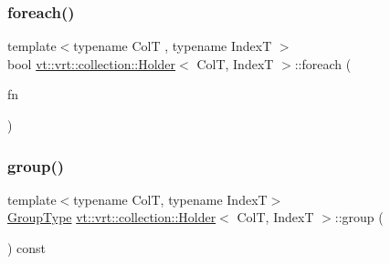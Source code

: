 \mbox{\label{structvt_1_1vrt_1_1collection_1_1_holder_a9cd9b190a9e1cf6726c520623a2ff4d2}} 
\subsubsection{\texorpdfstring{foreach()}{foreach()}}
{\footnotesize\ttfamily template$<$typename ColT , typename IndexT $>$ \\
bool \hyperlink{structvt_1_1vrt_1_1collection_1_1_holder}{vt\+::vrt\+::collection\+::\+Holder}$<$ ColT, IndexT $>$\+::foreach (\begin{DoxyParamCaption}\item[{\hyperlink{structvt_1_1vrt_1_1collection_1_1_holder_a26e20d23447e935e218a07ffd638706d}{Func\+Apply\+Type}}]{fn }\end{DoxyParamCaption})}

\mbox{\label{structvt_1_1vrt_1_1collection_1_1_holder_a579e33999a2d66ded9c3751be3ba11f8}} 
\subsubsection{\texorpdfstring{group()}{group()}}
{\footnotesize\ttfamily template$<$typename ColT, typename IndexT$>$ \\
\hyperlink{namespacevt_a27b5e4411c9b6140c49100e050e2f743}{Group\+Type} \hyperlink{structvt_1_1vrt_1_1collection_1_1_holder}{vt\+::vrt\+::collection\+::\+Holder}$<$ ColT, IndexT $>$\+::group (\begin{DoxyParamCaption}{ }\end{DoxyParamCaption}) const\hspace{0.3cm}{\ttfamily [inline]}}

\mbox{\label{structvt_1_1vrt_1_1collection_1_1_holder_afeafe4c77613531a166be80bdaea4fd6}} 
